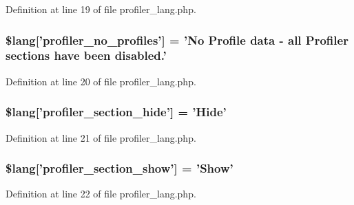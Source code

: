 Definition at line 19 of file profiler\-\_\-lang.\-php.

\subsubsection[{\$lang}]{\setlength{\rightskip}{0pt plus 5cm}\$lang['profiler\-\_\-no\-\_\-profiles'] = 'No Profile data -\/ all Profiler sections have been disabled.'}\label{profiler__lang_8php_aabea841eed12fa8271f13656fa7d5457}


Definition at line 20 of file profiler\-\_\-lang.\-php.

\subsubsection[{\$lang}]{\setlength{\rightskip}{0pt plus 5cm}\$lang['profiler\-\_\-section\-\_\-hide'] = 'Hide'}\label{profiler__lang_8php_a137158ebe1d58bd53bbbb4594f2bc0ed}


Definition at line 21 of file profiler\-\_\-lang.\-php.

\subsubsection[{\$lang}]{\setlength{\rightskip}{0pt plus 5cm}\$lang['profiler\-\_\-section\-\_\-show'] = 'Show'}\label{profiler__lang_8php_a3e3b1984f57780efbdaf6d01dac31f3c}


Definition at line 22 of file profiler\-\_\-lang.\-php.

